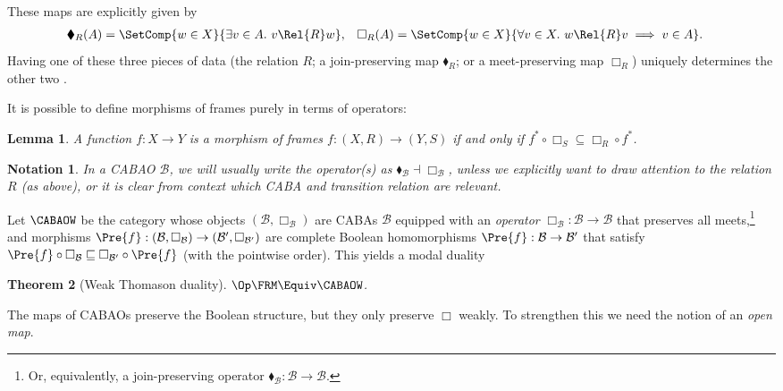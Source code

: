 \documentclass[10pt,a4paper]{article}
\newtheorem{theorem}{Theorem}
\newtheorem{lemma}[theorem]{Lemma}
\newtheorem*{notation}{Notation}
\begin{document}
These maps are explicitly given by
\begin{align*}
  \blacklozenge_R(A) &= \SetComp{w \in X}{\exists v \in A.\ v \Rel{R} w}, 
                     &
  \Box_R(A) &= \SetComp{w \in X}{\forall v \in X.\ w \Rel{R} v \implies v \in A}.
\end{align*}
Having one of these three pieces of data (the relation $R$; a
join-preserving map $\blacklozenge_R$; or a meet-preserving map
$\Box_R$) uniquely determines the other two \cite{kavvos_2024a}.

It is possible to define morphisms of frames purely in terms of operators:
\begin{lemma}
  \label{lemma:frm-morphism-box}
  A function $f : X \to Y$ is a morphism of frames \(f : (X, R) \to (Y, S)\) if
  and only if \(f^* \circ \Box_S \subseteq \Box_R \circ f^*\).
\end{lemma}

\begin{notation}
  In a CABAO \(\mathcal{B}\), we will usually write the operator(s) as
  \(\blacklozenge_{\mathcal{B}} \dashv \Box_{\mathcal{B}}\), unless we
  explicitly want to draw attention to the relation \(R\) (as above),
  or it is clear from context which CABA and transition relation are
  relevant.
\end{notation}

Let $\CABAOW$ be the category whose objects
$(\mathcal{B}, \Box_\mathcal{B})$ are CABAs $\mathcal{B}$ equipped
with an \emph{operator}
$\Box_{\mathcal{B}} : \mathcal{B} \to \mathcal{B}$ that preserves all
meets,\footnote{Or, equivalently, a join-preserving operator
  $\blacklozenge_{\mathcal{B}} : \mathcal{B} \to \mathcal{B}$.} and
morphisms
$\Pre{f} : (\mathcal{B}, \Box_\mathcal{B}) \to (\mathcal{B}',
\Box_{\mathcal{B}'})$ are complete Boolean homomorphisms
$\Pre{f} : \mathcal{B} \to \mathcal{B}'$ that satisfy
$\Pre{f} \circ \Box_\mathcal{B} \sqsubseteq \Box_{\mathcal{B}'} \circ
\Pre{f}$ (with the pointwise order). This yields a modal duality

\begin{theorem}[Weak Thomason duality]
  \label{theorem:thomason}
  \(\Op\FRM \Equiv \CABAOW\).
\end{theorem}

The maps of CABAOs preserve the Boolean structure, but they only preserve
$\Box$ weakly. To strengthen this we need the notion of an \emph{open
map}.
\end{document}
